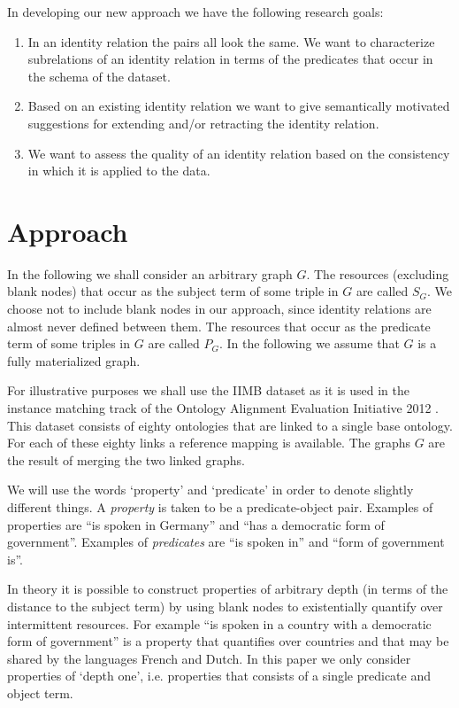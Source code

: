 \documentclass[letterpaper]{article}
\begin{document}
In developing our new approach we have the following research goals:

\begin{enumerate}
\item In an identity relation the pairs all look the same. We want to characterize subrelations of an identity relation in terms of the predicates that occur in the schema of the dataset.
\item Based on an existing identity relation we want to give semantically motivated suggestions for extending and/or retracting the identity relation.
\item We want to assess the quality of an identity relation based on the consistency in which it is applied to the data.
\end{enumerate}

\section{Approach}
\label{sec:approach}

In the following we shall consider an arbitrary graph $G$. The resources (excluding blank nodes) that occur as the subject term of some triple in $G$ are called $S_G$. We choose not to include blank nodes in our approach, since identity relations are almost never defined between them. The resources that occur as the predicate term of some triples in $G$ are called $P_G$. In the following we assume that $G$ is a fully materialized graph.

For illustrative purposes we shall use the IIMB dataset as it is used in the instance matching track of the Ontology Alignment Evaluation Initiative 2012 \cite{oaei_2012}. This dataset consists of eighty ontologies that are linked to a single base ontology. For each of these eighty links a reference mapping is available. The graphs $G$ are the result of merging the two linked graphs.

We will use the words `property' and `predicate' in order to denote slightly different things. A \emph{property} is taken to be a predicate-object pair. Examples of properties are ``is spoken in Germany'' and ``has a democratic form of government''. Examples of \emph{predicates} are ``is spoken in'' and ``form of government is''.

In theory it is possible to construct properties of arbitrary depth (in terms of the distance to the subject term) by using blank nodes to existentially quantify over intermittent resources. For example ``is spoken in a country with a democratic form of government'' is a property that quantifies over countries and that may be shared by the languages French and Dutch. In this paper we only consider properties of `depth one', i.e. properties that consists of a single predicate and object term.
\end{document}
